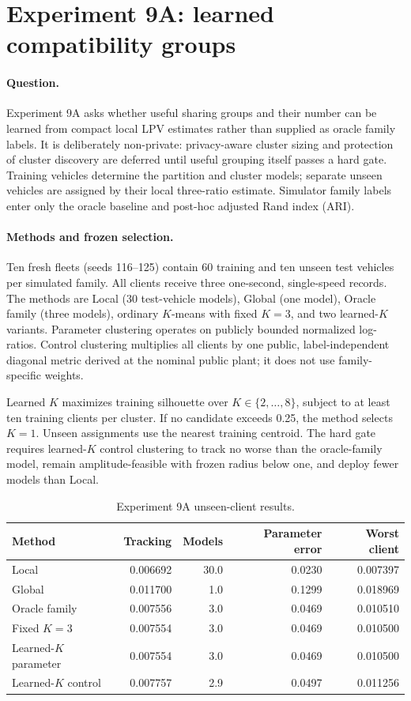 \section{Experiment 9A: learned compatibility groups}
\label{sec:experiment9a}

\paragraph{Question.}
Experiment 9A asks whether useful sharing groups and their number can be learned
from compact local LPV estimates rather than supplied as oracle family labels.
It is deliberately non-private: privacy-aware cluster sizing and protection of
cluster discovery are deferred until useful grouping itself passes a hard gate.
Training vehicles determine the partition and cluster models; separate unseen
vehicles are assigned by their local three-ratio estimate. Simulator family
labels enter only the oracle baseline and post-hoc adjusted Rand index (ARI).

\paragraph{Methods and frozen selection.}
Ten fresh fleets (seeds 116--125) contain 60 training and ten unseen test
vehicles per simulated family. All clients receive three one-second,
single-speed records. The methods are Local (30 test-vehicle models), Global
(one model), Oracle family (three models), ordinary $K$-means with fixed $K=3$,
and two learned-$K$ variants. Parameter clustering operates on publicly bounded
normalized log-ratios. Control clustering multiplies all clients by one public,
label-independent diagonal metric derived at the nominal public plant; it does
not use family-specific weights.

Learned $K$ maximizes training silhouette over $K\in\{2,\ldots,8\}$, subject to
at least ten training clients per cluster. If no candidate exceeds 0.25, the
method selects $K=1$. Unseen assignments use the nearest training centroid.
The hard gate requires learned-$K$ control clustering to track no worse than the
oracle-family model, remain amplitude-feasible with frozen radius below one,
and deploy fewer models than Local.

\begin{table}[htbp]
\centering
\caption{Experiment 9A unseen-client results.}
\label{tab:experiment9a-results}
\begin{tabular}{lrrrr}
\toprule
Method & Tracking & Models & Parameter error & Worst client\\
\midrule
Local & 0.006692 & 30.0 & 0.0230 & 0.007397\\
Global & 0.011700 & 1.0 & 0.1299 & 0.018969\\
Oracle family & 0.007556 & 3.0 & 0.0469 & 0.010510\\
Fixed $K=3$ & 0.007554 & 3.0 & 0.0469 & 0.010500\\
Learned-$K$ parameter & 0.007554 & 3.0 & 0.0469 & 0.010500\\
Learned-$K$ control & 0.007757 & 2.9 & 0.0497 & 0.011256\\
\bottomrule
\end{tabular}
\end{table}

